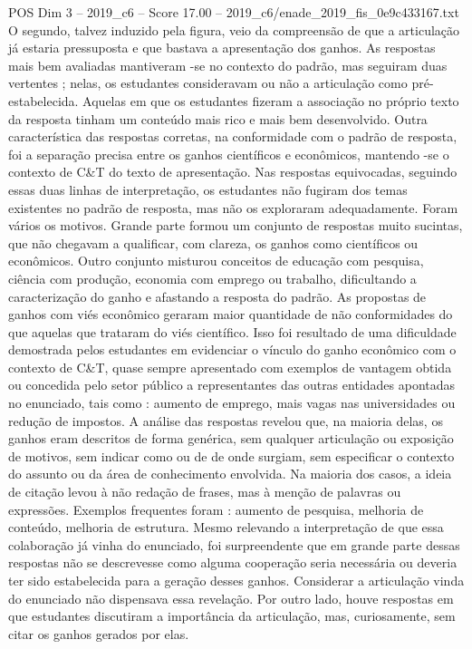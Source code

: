 \begin{textsample}{POS Dim 3 – 2019\_c6 – Score 17.00 – 2019\_c6/enade\_2019\_fis\_0e9c433167.txt}
O segundo, talvez induzido pela figura, veio da compreensão de que a articulação já estaria pressuposta e que bastava a apresentação dos ganhos.
As respostas mais bem avaliadas mantiveram -se no contexto do padrão, mas seguiram duas vertentes ; nelas, os estudantes consideravam ou não a articulação como pré-estabelecida.
Aquelas em que os estudantes fizeram a associação no próprio texto da resposta tinham um conteúdo mais rico e mais bem desenvolvido.
Outra característica das respostas corretas, na conformidade com o padrão de resposta, foi a separação precisa entre os ganhos científicos e econômicos, mantendo -se o contexto de C\&T do texto de apresentação.
Nas respostas equivocadas, seguindo essas duas linhas de interpretação, os estudantes não fugiram dos temas existentes no padrão de resposta, mas não os exploraram adequadamente.
Foram vários os motivos.
Grande parte formou um conjunto de respostas muito sucintas, que não chegavam a qualificar, com clareza, os ganhos como científicos ou econômicos.
Outro conjunto misturou conceitos de educação com pesquisa, ciência com produção, economia com emprego ou trabalho, dificultando a caracterização do ganho e afastando a resposta do padrão.
As propostas de ganhos com viés econômico geraram maior quantidade de não conformidades do que aquelas que trataram do viés científico.
Isso foi resultado de uma dificuldade demostrada pelos estudantes em evidenciar o vínculo do ganho econômico com o contexto de C\&T, quase sempre apresentado com exemplos de vantagem obtida ou concedida pelo setor público a representantes das outras entidades apontadas no enunciado, tais como : aumento de emprego, mais vagas nas universidades ou redução de impostos.
A análise das respostas revelou que, na maioria delas, os ganhos eram descritos de forma genérica, sem qualquer articulação ou exposição de motivos, sem indicar como ou de de onde surgiam, sem especificar o contexto do assunto ou da área de conhecimento envolvida.
Na maioria dos casos, a ideia de citação levou à não redação de frases, mas à menção de palavras ou expressões.
Exemplos frequentes foram : aumento de pesquisa, melhoria de conteúdo, melhoria de estrutura.
Mesmo relevando a interpretação de que essa colaboração já vinha do enunciado, foi surpreendente que em grande parte dessas respostas não se descrevesse como alguma cooperação seria necessária ou deveria ter sido estabelecida para a geração desses ganhos.
Considerar a articulação vinda do enunciado não dispensava essa revelação.
Por outro lado, houve respostas em que estudantes discutiram a importância da articulação, mas, curiosamente, sem citar os ganhos gerados por elas.

\end{textsample}
